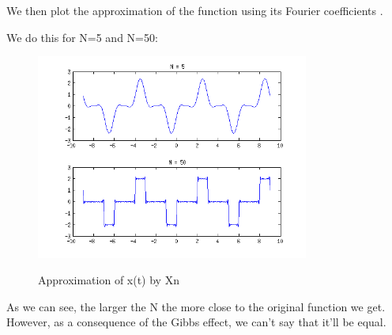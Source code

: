 We then plot the approximation of the function using its Fourier coefficients 
\cite{wprobl_c1}.


We do this for N=5 and N=50:

\begin{figure}[H]
\caption{Approximation of x(t) by Xn}
\centering
\includegraphics[width=0.8\textwidth]{figs/c1p1c.png}
\label{fig:c1p1c}
\end{figure} 

As we can see, the larger the N the more close to the original function we get. However, 
as a consequence of the Gibbs effect, we can't say that it'll be equal.
